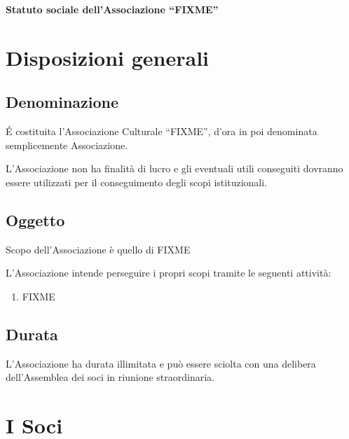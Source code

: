 \documentclass[a4paper,11pt,oneside]{article}
\begin{document}
\pagestyle{empty}
\linenumbers
\textbf{Statuto sociale dell'Associazione ``FIXME''}

\section{Disposizioni generali}

\subsection{Denominazione}
É costituita l'Associazione Culturale ``FIXME'', d'ora in poi denominata semplicemente Associazione.

L'Associazione non ha finalità di lucro e gli eventuali utili conseguiti dovranno essere utilizzati per il conseguimento degli scopi istituzionali.

\subsection{Oggetto}
Scopo dell'Associazione è quello di FIXME


L'Associazione intende perseguire i propri scopi tramite le seguenti attività:

\begin{enumerate}
	\item FIXME
\end{enumerate}

\subsection{Durata}
L'Associazione ha durata illimitata e può essere sciolta con una delibera dell'Assemblea dei soci in riunione straordinaria.

\section{I Soci}
\end{document}
